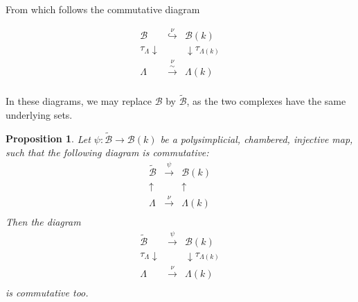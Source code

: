 \documentclass{amsart}
\theoremstyle{theorem}
\theoremstyle{lemma}
\theoremstyle{prop}
\newtheorem{prop}[lemma]{Proposition}
\theoremstyle{definition}
\theoremstyle{corollary}
\theoremstyle{remark}
\newcommand{\B}{\mathcal{B}}
\begin{document}
From which follows the commutative diagram


\[\begin{array}{ccc}
\B &\overset{\nu}{\hookrightarrow}&\B(k)\\
\tau_\Lambda \downarrow & & \downarrow \tau_{\Lambda(k)}\\
\Lambda &  \overset{\nu}{\xrightarrow{\sim}} & \Lambda(k)\\
\end{array}\]

In these diagrams, we may replace $\B$ by $\tilde{\B}$, as the two complexes have the same underlying sets.

\begin{prop} \label{commute} Let $\psi: \tilde{\B} \rightarrow \B(k)$ be a polysimplicial, chambered, injective map, such that the following diagram is commutative:
\[\begin{array}{ccc}
\tilde{\B} &\overset{\psi}{\rightarrow}&\B(k) \\
\uparrow & & \uparrow \\
\Lambda & \overset{\nu}{\rightarrow} & \Lambda(k) \\
\end{array}\]
Then the diagram
\[\begin{array}{ccc}
\tilde{\B} &\overset{\psi}{\rightarrow}&\B(k) \\
\tau_\Lambda \downarrow & & \downarrow \tau_{\Lambda(k)}\\
\Lambda &  \overset{\nu}{\rightarrow} & \Lambda(k) \\
\end{array}\]
is commutative too.
\end{prop}
\end{document}
